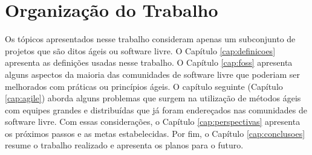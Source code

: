 \section{Organização do Trabalho}
\label{sec:organizacao_trabalho}

Os tópicos apresentados nesse trabalho consideram apenas um
subconjunto de projetos que são ditos ágeis ou software livre. O
Capítulo \ref{cap:definicoes} apresenta as definições usadas nesse
trabalho. O Capítulo \ref{cap:foss} apresenta alguns aspectos da
maioria das comunidades de software livre que poderiam ser melhorados
com práticas ou princípios ágeis. O capítulo seguinte (Capítulo
\ref{cap:agile}) aborda alguns problemas que surgem na utilização de
métodos ágeis com equipes grandes e distribuídas que já foram
endereçados nas comunidades de software livre. Com essas
considerações, o Capítulo \ref{cap:perspectivas} apresenta os próximos
passos e as metas estabelecidas. Por fim, o Capítulo
\ref{cap:conclusoes} resume o trabalho realizado e apresenta os planos
para o futuro.
